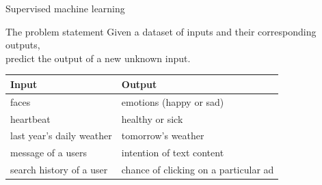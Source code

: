 \documentclass[10pt]{beamer}
\begin{document}
{
\begin{frame}[fragile]{Supervised machine learning}


\begin{exampleblock}{The problem statement}
Given a dataset of inputs and their corresponding outputs,\\ predict the output of a new unknown input.
\end{exampleblock}


\vspace{1cm}
\begin{table}
\begin{tabular}{l  l }
\toprule
Input & Output\\\midrule
faces & emotions (happy or sad)\\
heartbeat & healthy or sick\\
last year's daily weather & tomorrow's weather\\
message of a users & intention of text content\\
search history of a user & chance of clicking on a particular ad\\
\end{tabular}
\end{table}




\end{frame}}
\end{document}
